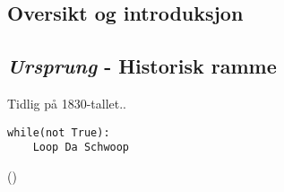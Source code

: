 
\subsection{Oversikt og introduksjon}


\subsection{{\itshape Ursprung} - Historisk ramme}

Tidlig på 1830-tallet.. 

\begin{lstlisting}[label=some-code,caption=Some Code]
while(not True):
	Loop Da Schwoop
\end{lstlisting}

\newpage
\layout()
